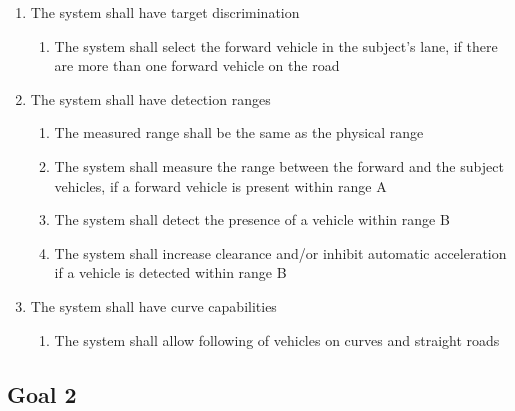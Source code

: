 \begin{enumerate}
\begin{enumerate}[label*=\arabic*]
\begin{enumerate}[label*=\arabic*]
        \end{enumerate}
        \item{The system shall have target discrimination}
        \begin{enumerate}[label*=\arabic*]
            \item{The system shall select the forward vehicle in the subject’s lane, if there are more than one forward vehicle on the road}
        \end{enumerate}
        \item{The system shall have detection ranges}
        \begin{enumerate}[label*=\arabic*]
            \item{The measured range shall be the same as the physical range}
            \item{The system shall measure the range between the forward and the subject vehicles, if a forward vehicle is present within range A}
            \item{The system shall detect the presence of a vehicle within range B}
            \item{The system shall increase clearance and/or inhibit automatic acceleration if a vehicle is detected within range B}
        \end{enumerate}
        \item{The system shall have curve capabilities}
        \begin{enumerate}[label*=\arabic*]
            \item The system shall allow following of vehicles on curves and straight roads
        \end{enumerate}
    \end{enumerate}
\end{enumerate}


\vspace{1.5cm}

\subsection{Goal 2}

